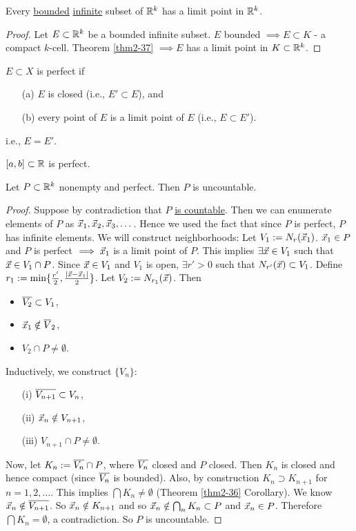 \documentclass[]{article}
\begin{document}
\begin{theorem}
	[Weierstrass] Every \ul{bounded} \ul{infinite} subset of $\mathbb{R}^k$ has a limit point in $\mathbb{R}^k$.
\end{theorem}
\begin{proof}
	Let $E\subset\mathbb{R}^k$ be a bounded infinite subset.
	$E$ bounded $\implies E\subset K$ - a compact $k$-cell.
	Theorem \ref{thm2-37} $\implies E$ has a limit point in $K\subset\mathbb{R}^k$.
\end{proof}

\begin{definition}
	 $E\subset X$ is perfect if
	\begin{enumerate}
		\item[(a)] $E$ is closed (i.e., $E'\subset E$), and
		\item[(b)] every point of $E$ is a limit point of $E$ (i.e., $E\subset E'$).
	\end{enumerate}
	i.e., $E = E'$.
\end{definition}
\begin{example}
	$[a,b]\subset\mathbb{R}$ is perfect.
\end{example}
\begin{theorem}
	Let $P\subset\mathbb{R}^k$ nonempty and perfect. Then $P$ is uncountable.
\end{theorem}
\begin{proof}
	Suppose by contradiction that $P$ \ul{is countable}. Then we can enumerate elements of $P$ as $\vec{x}_1,\vec{x}_2,\vec{x}_3,\dots$.
	Hence we used the fact that since $P$ is perfect, $P$ has infinite elements.
	We will construct neighborhoods: Let $V_1 := N_r(\vec{x}_1)$. $\vec{x}_1\in P$ and $P$ is perfect $\implies \vec{x}_1$ is a limit point of $P$.
	This implies $\exists \vec{x}\in V_1$ such that $\vec{x}\in V_1\cap P$. Since $\vec{x}\in V_1$ and $V_1$ is open, $\exists r'>0$ such that $N_{r'}(\vec{x})\subset V_1$.
	Define $r_1 := \min\{\frac{r'}{2}, \frac{|\vec{x}-\vec{x}_1|}{2}\}$.
	Let $V_2 := N_{r_1}(\vec{x})$. Then
	\begin{itemize}
		\item $\overline{V_2} \subset V_1$,
		\item $\vec{x}_1\notin \overline{V}_2$,
		\item $V_2\cap P\neq \emptyset$.
	\end{itemize}
	Inductively, we construct $\{V_n\}$:
	\begin{enumerate}
		\item[(i)] $\overline{V_{n+1}}\subset V_n$,
		\item[(ii)] $\vec{x}_n\notin V_{n+1}$,
		\item[(iii)] $V_{n+1}\cap P\neq \emptyset$.
	\end{enumerate}
	Now, let $K_n:= \overline{V_n}\cap P$, where $\overline{V_n}$ closed and $P$ closed.
	Then $K_n$ is closed and hence compact (since $\overline{V_n}$ is bounded).
	Also, by construction $K_n\supset K_{n+1}$ for $n=1,2,\dots$.
	This implies \ul{$\bigcap K_n\neq \emptyset$} (Theorem \ref{thm2-36} Corollary).
	We know $\vec{x}_n\notin \overline{V_{n+1}}$. So $\vec{x}_n\notin K_{n+1}$ and so $\vec{x}_n\notin \bigcap_n K_n\subset P$ and $\vec{x}_n\in P$.
	Therefore $\bigcap K_n=\emptyset$, a contradiction. So $P$ is uncountable.
\end{proof}
\end{document}
